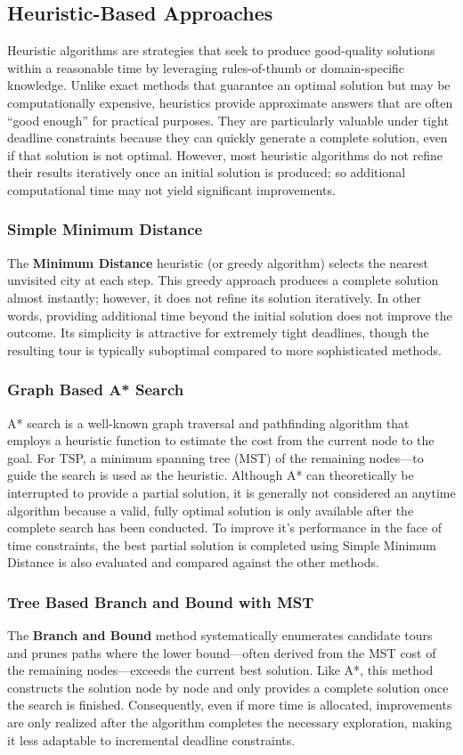 \documentclass[11pt]{article}
\begin{document}
	\subsection{Heuristic-Based Approaches}
	Heuristic algorithms are strategies that seek to produce good-quality solutions within a reasonable time by leveraging rules-of-thumb or domain-specific knowledge. Unlike exact methods that guarantee an optimal solution but may be computationally expensive, heuristics provide approximate answers that are often “good enough” for practical purposes. They are particularly valuable under tight deadline constraints because they can quickly generate a complete solution, even if that solution is not optimal. However, most heuristic algorithms do not refine their results iteratively once an initial solution is produced; so additional computational time may not yield significant improvements.
	
	\subsubsection{Simple Minimum Distance}
	The \textbf{Minimum Distance} heuristic (or greedy algorithm) selects the nearest unvisited city at each step. This greedy approach produces a complete solution almost instantly; however, it does not refine its solution iteratively. In other words, providing additional time beyond the initial solution does not improve the outcome. Its simplicity is attractive for extremely tight deadlines, though the resulting tour is typically suboptimal compared to more sophisticated methods.
	
	\subsubsection{Graph Based A* Search}
	A* search is a well-known graph traversal and pathfinding algorithm that employs a heuristic function to estimate the cost from the current node to the goal. For TSP, a minimum spanning tree (MST) of the remaining nodes—to guide the search is used as the heuristic. Although A* can theoretically be interrupted to provide a partial solution, it is generally not considered an anytime algorithm because a valid, fully optimal solution is only available after the complete search has been conducted. To improve it's performance in the face of time constraints, the best partial solution is completed using Simple Minimum Distance is also evaluated and compared against the other methods.
	
	\subsubsection{Tree Based Branch and Bound with MST}
	The \textbf{Branch and Bound} method systematically enumerates candidate tours and prunes paths where the lower bound—often derived from the MST cost of the remaining nodes—exceeds the current best solution. Like A*, this method constructs the solution node by node and only provides a complete solution once the search is finished. Consequently, even if more time is allocated, improvements are only realized after the algorithm completes the necessary exploration, making it less adaptable to incremental deadline constraints.
\end{document}

